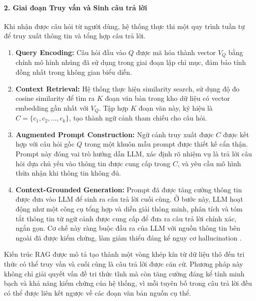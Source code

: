 \paragraph{2. Giai đoạn Truy vấn và Sinh câu trả lời}
Khi nhận được câu hỏi từ người dùng, hệ thống thực thi một quy trình tuần tự để truy xuất thông tin và tổng hợp câu trả lời.

\begin{enumerate}
    \item \textbf{Query Encoding:} Câu hỏi đầu vào $Q$ được mã hóa thành vector $V_Q$ bằng chính mô hình nhúng đã sử dụng trong giai đoạn lập chỉ mục, đảm bảo tính đồng nhất trong không gian biểu diễn.

    \item \textbf{Context Retrieval:} Hệ thống thực hiện similarity search, sử dụng độ đo cosine similarity để tìm ra $K$ đoạn văn bản trong kho dữ liệu có vector embedding gần nhất với $V_Q$. Tập hợp $K$ đoạn văn này, ký hiệu là $C = \{c_1, c_2, ..., c_k\}$, tạo thành ngữ cảnh tham chiếu cho câu hỏi.

    \item \textbf{Augmented Prompt Construction:} Ngữ cảnh truy xuất được $C$ được kết hợp với câu hỏi gốc $Q$ trong một khuôn mẫu prompt được thiết kế cẩn thận. Prompt này đóng vai trò hướng dẫn LLM, xác định rõ nhiệm vụ là trả lời câu hỏi dựa chủ yếu vào thông tin được cung cấp trong $C$, và yêu cầu mô hình thừa nhận khi thông tin không đủ.

    \item \textbf{Context-Grounded Generation:} Prompt đã được tăng cường thông tin được đưa vào LLM để sinh ra câu trả lời cuối cùng. Ở bước này, LLM hoạt động như một công cụ tổng hợp và diễn giải thông minh, phân tích và tóm tắt thông tin từ ngữ cảnh được cung cấp để đưa ra câu trả lời chính xác, ngắn gọn. Cơ chế này ràng buộc đầu ra của LLM với nguồn thông tin bên ngoài đã được kiểm chứng, làm giảm thiểu đáng kể nguy cơ hallucination \cite{turn0academia26}.
\end{enumerate}

Kiến trúc RAG được mô tả tạo thành một vòng khép kín từ dữ liệu thô đến tri thức có thể truy vấn và cuối cùng là câu trả lời được căn cứ. Phương pháp này không chỉ giải quyết vấn đề tri thức tĩnh mà còn tăng cường đáng kể tính minh bạch và khả năng kiểm chứng của hệ thống, vì mỗi tuyên bố trong câu trả lời đều có thể được liên kết ngược về các đoạn văn bản nguồn cụ thể.
